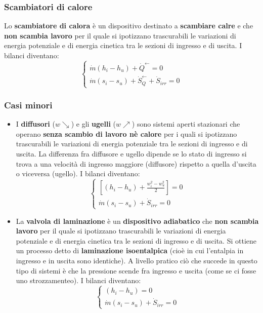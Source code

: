 \subsubsection{Scambiatori di calore}
Lo \textbf{scambiatore di calora} è un dispositivo destinato a \textbf{scambiare calre} e che \textbf{non scambia lavoro} per il quale si ipotizzano trascurabili le variazioni di energia potenziale e di energia cinetica tra le sezioni di ingresso e di uscita.\newline
\newline
I bilanci diventano:
\[
    \begin{cases}
        \dot{m}(h_i - h_u) + \dot{Q}^\leftarrow  = 0\\
        \dot{m}(s_i-s_u) + \dot{S}_{Q}^\leftarrow + \dot{S}_{irr} =0 
    \end{cases}
\]
\subsubsection{Casi minori}
\begin{itemize}
    \item I \textbf{diffusori} ($w \searrow$) e gli \textbf{ugelli} ($w \nearrow$) sono sistemi aperti stazionari che operano \textbf{senza scambio di lavoro nè calore} per i quali si ipotizzano trascurabili le variazioni di energia potenziale tra le sezioni di ingresso e di uscita.\newline
    La differenza fra diffusore e ugello dipende se lo stato di ingresso si trova a una velocità di ingresso maggiore (diffusore) rispetto a quella d'uscita o viceversa (ugello).\newline
    \newline
    I bilanci diventano:
    \[
        \begin{cases}
            \left[(h_i-h_u) + \frac{w_i^2 - w_u^2}{2}\right] = 0\\
            \dot{m} (s_i-s_u) + \dot{S}_{irr} =0 
        \end{cases}
    \]
    \item La \textbf{valvola di laminazione} è un \textbf{dispositivo adiabatico} che \textbf{non scambia lavoro} per il quale si ipotizzano trascurabili le variazioni di energia potenziale e di energia cinetica tra le sezioni di ingresso e di uscita. Si ottiene un processo detto di \textbf{laminazione isoentalpica} (cioè in cui l'entalpia in ingresso e in uscita sono identiche).\newline
    A livello pratico ciò che succede in questo tipo di sistemi è che la pressione scende fra ingresso e uscita (come se ci fosse uno strozzamenteo).\newline
    \newline
    I bilanci diventano:
    \[
        \begin{cases}
            (h_i- h_u) = 0\\
            \dot{m} (s_i-s_u) + \dot{S}_{irr} = 0
        \end{cases}
    \]
\end{itemize}
